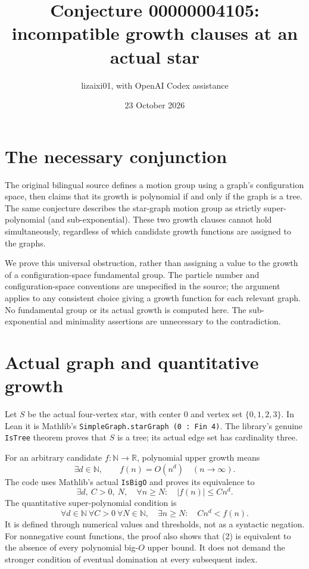 \documentclass[11pt]{article}
\title{Conjecture 00000004105:\\incompatible growth clauses at an actual star}
\author{lizaixi01, with OpenAI Codex assistance}
\date{23 October 2026}
\begin{document}
\maketitle
\section{The necessary conjunction}
The original bilingual source defines a motion group using a graph's
configuration space, then claims that its growth is polynomial if and
only if the graph is a tree. The same conjecture describes the star-graph
motion group as strictly super-polynomial (and sub-exponential).
These two growth clauses cannot hold simultaneously, regardless of
which candidate growth functions are assigned to the graphs.

We prove this universal obstruction, rather than assigning a value to
the growth of a configuration-space fundamental group. The particle
number and configuration-space conventions are unspecified in the
source; the argument applies to any consistent choice giving a growth
function for each relevant graph. No fundamental group or its actual
growth is computed here. The sub-exponential and minimality assertions
are unnecessary to the contradiction.

\section{Actual graph and quantitative growth}
Let $S$ be the actual four-vertex star, with center $0$ and vertex set
$\{0,1,2,3\}$. In Lean it is Mathlib's
\texttt{SimpleGraph.starGraph (0 : Fin 4)}. The library's genuine
\texttt{IsTree} theorem proves that $S$ is a tree; its actual edge set
has cardinality three.

For an arbitrary candidate $f:\mathbb N\to\mathbb R$, polynomial
upper growth means
\[
 \exists d\in\mathbb N,\qquad f(n)=O(n^d)\quad(n\to\infty).
\]
The code uses Mathlib's actual \texttt{IsBigO} and proves its equivalence to
\[
 \exists d,\ C>0,\ N,\quad
 \forall n\geq N:\quad |f(n)|\leq Cn^d.                     \tag{1}
\]
The quantitative super-polynomial condition is
\[
 \forall d\in\mathbb N\ \forall C>0\ \forall N\in\mathbb N,
 \quad \exists n\geq N:\quad Cn^d<f(n).                    \tag{2}
\]
It is defined through numerical values and thresholds, not as a
syntactic negation. For nonnegative count functions, the proof also
shows that (2) is equivalent to the absence of every polynomial
big-$O$ upper bound. It does not demand the stronger condition of
eventual domination at every subsequent index.
\end{document}
